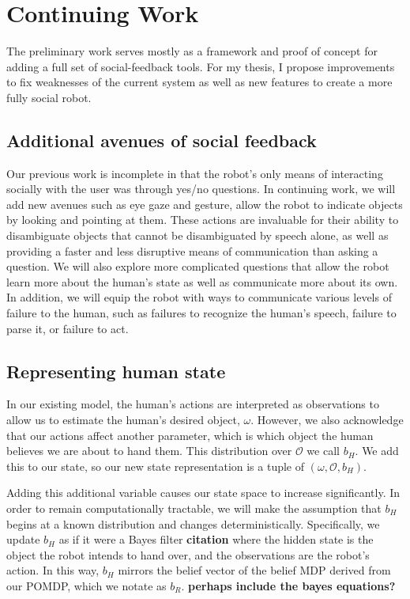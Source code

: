 \documentclass{article}
\begin{document}
\section{Continuing Work}


The preliminary work serves mostly as a framework and proof of concept for adding a full set of social-feedback tools. For my thesis, I propose improvements to fix weaknesses of the current system as well as new features to create a more fully social robot.  

\subsection{Additional avenues of social feedback}

Our previous work is incomplete in that the robot's only means of interacting socially with the user was through yes/no questions. In continuing work, we will add new avenues such as eye gaze and gesture, allow the robot to indicate objects by looking and pointing at them. These actions are invaluable for their ability to disambiguate objects that cannot be disambiguated by speech alone, as well as providing a faster and less disruptive means of communication than asking a question. We will also explore more complicated questions that allow the robot learn more about the human's state as well as communicate more about its own. In addition, we will equip the robot with ways to communicate various levels of failure to the human, such as failures to recognize the human's speech, failure to parse it, or failure to act. 

\subsection{Representing human state}

In our existing model, the human's actions are interpreted as observations to allow us to estimate the human's desired object, $\omega$. However, we also acknowledge that our actions affect another parameter, which is which object the human believes we are about to hand them. This distribution over $\mathcal{O}$ we call $b_H$. We add this to our state, so our new state representation is a tuple of $(\omega, \mathcal{O}, b_H)$. 

Adding this additional variable causes our state space to increase significantly. In order to remain computationally tractable, we will make the assumption that $b_H$ begins at a known distribution and changes deterministically. Specifically, we update $b_H$ as if it were a Bayes filter \textbf{citation} where the hidden state is the object the robot intends to hand over, and the observations are the robot's action. In this way, $b_H$ mirrors the belief vector of the belief MDP derived from our POMDP, which we notate as $b_R$. 
\textbf{perhaps include the bayes equations?}
\end{document}

